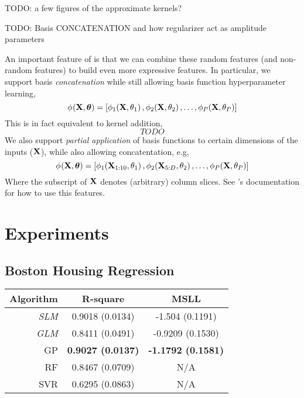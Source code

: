 \documentclass[11pt, oneside]{article}
\begin{document}
TODO: a few figures of the approximate kernels?

TODO: Basis CONCATENATION and how regularizer act as amplitude parameters

An important feature of \revrand is that we can combine these random features
(and non-random features) to build even more expressive features. In
particular, we support basis \emph{concatenation} while still allowing basis
function hyperparameter learning,
\begin{equation}
    \func{\featsym}{\ins, \boldsymbol\param}{} = \sbrac{
        \func{\featsym}{\ins, \param_1}{1},
        \func{\featsym}{\ins, \param_2}{2},
        \ldots,
        \func{\featsym}{\ins, \param_P}{P}
    } 
\end{equation}
This is in fact equivalent to kernel addition,
\begin{equation}
    TODO
\end{equation}
We also support \emph{partial application} of basis functions to certain
dimensions of the inputs ($\ins$), while also allowing concatentation, e.g,
\begin{equation}
    \func{\featsym}{\ins, \boldsymbol\param}{} = \sbrac{
        \func{\featsym}{\ins_{1:10}, \param_1}{1},
        \func{\featsym}{\ins_{5:D}, \param_2}{2},
        \ldots,
        \func{\featsym}{\ins, \param_P}{P}
    } 
\end{equation}
Where the subscript of $\ins$ denotes (arbitrary) column slices. See \revrand's 
documentation for how to use this features.

\section{Experiments}

\subsection{Boston Housing Regression}

\begin{table}[htb]

    \centering
    \begin{tabular}{r|c c}
        \textbf{Algorithm} & \textbf{R-square} & \textbf{MSLL} \\
        \hline
        \emph{SLM} & 0.9018 (0.0134) & -1.504 (0.1191) \\
        \emph{GLM} & 0.8411 (0.0491) & -0.9209 (0.1530) \\
        GP & \textbf{0.9027 (0.0137)} & \textbf{-1.1792 (0.1581)} \\
        RF & 0.8467 (0.0709) & N/A \\ 
        SVR & 0.6295 (0.0863) & N/A \\
        \hline
    \end{tabular}

\end{table}
\end{document}
